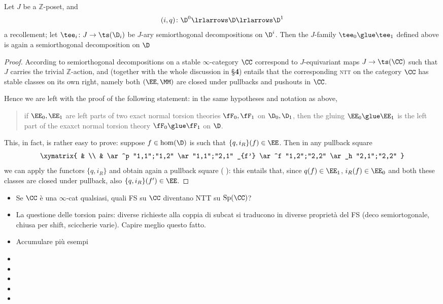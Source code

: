 \begin{theorem}
Let $J$ be a $\mathbb{Z}$-poset, and 
$$(i,q)\colon \D^0 \lrlarrows  \D \lrlarrows  \D^1$$
a recollement; let $\tee_i\colon J\to  \ts (\D_i)$ be $J$-ary semiorthogonal decompositions on $\D^i$. Then the $J$-family $\tee_0\glue\tee_1$ defined above is again a semiorthogonal decomposition on $\D$
\end{theorem}
\begin{proof}
According to \cite[\S\textbf{4.1}]{heart} semiorthogonal decompositions on a stable $\infty$-category $\CC$ correspond to $J$-equivariant maps $J\to  \ts (\CC)$ such that $J$ carries the trivial $\mathbb{Z}$-action, and \cite[ \textbf{4.6}]{heart} (together with the whole discussion in \S\textbf{4}) entails that the corresponding \textsc{ntt} on the category $\CC$ has stable classes on its own right, namely both $(\EE,\MM)$ are closed under pullbacks and pushouts in $\CC$.

Hence we are left with the proof of the following statement: in the same hypotheses and notation as above,
\begin{quote}
if $\EE_0,\EE_1$ are left parts of two exact normal torsion theories $\fF_0,\fF_1$ on $\D_0, \D_1$, then the gluing $\EE_0\glue \EE_1$ is the left part of the exaxct normal torsion theory $\fF_0\glue\fF_1$ on $\D$.
\end{quote}
This, in fact, is rather easy to prove: suppose $f\in\hom(\D)$ is such that $\{q, i_R\}(f)\in \EE$. Then in any pullback square
\makeatother
\[
	\xymatrix{
	  	&  \\
	  	& 
	  \ar^p "1,1";"1,2" 
	  \ar "1,1";"2,1" _{f'}
	  \ar^f "1,2";"2,2" 
	  \ar_h "2,1";"2,2" 
	}
\]
\makeatletter
we can apply the functors $\{q, i_R\}$ and obtain again a pullback square ( ): this entails that, since $q(f)\in \EE_1$, $i_R(f)\in \EE_0$ and both these classes are closed under pullback, also $\{q, i_R\}(f')\in \EE$.
\end{proof}

\newpage

\begin{itemize}
\item Se $\CC$ è una $\infty$-cat qualsiasi, quali FS su $\CC$ diventano NTT su $\text{Sp}(\CC)$?
\item La questione delle torsion pairs: diverse richieste alla coppia di subcat si traducono in diverse proprietà del FS (deco semiortogonale, chiusa per shift, sciccherie varie). Capire meglio questo fatto.
\item Accumulare più esempi
\item 
\item 
\item 
\item 
\item 
\end{itemize}